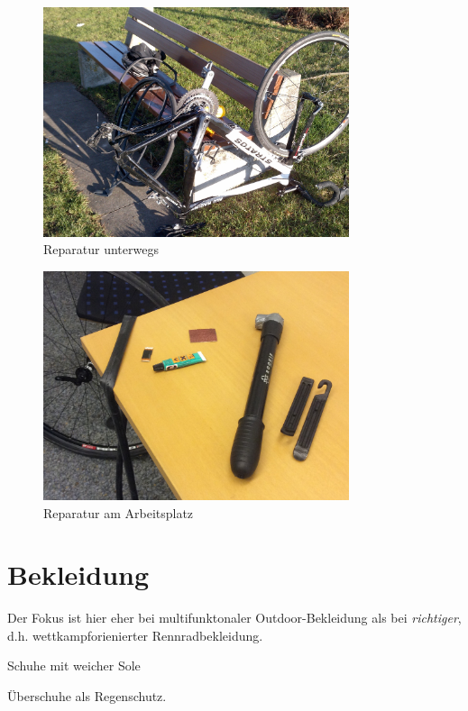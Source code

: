 \begin{figure}[htpb]
        \centering
        \includegraphics[width=0.8\textwidth]{figures/reparatur-unterwegs.jpg}
        \caption{Reparatur unterwegs}
        \label{fig:reparatur-unterwegs}
\end{figure}

\begin{figure}[htpb]
        \centering
        \includegraphics[width=0.8\textwidth]{figures/reparatur-arbeitsplatz.jpg}
        \caption{Reparatur am Arbeitsplatz}
        \label{fig:reparatur-arbeitsplatz}
\end{figure}

\section{Bekleidung}

Der Fokus ist hier eher bei multifunktonaler Outdoor-Bekleidung als bei \emph{richtiger},
d.h. wettkampforienierter Rennradbekleidung.

Schuhe mit weicher Sole

Überschuhe als Regenschutz.
